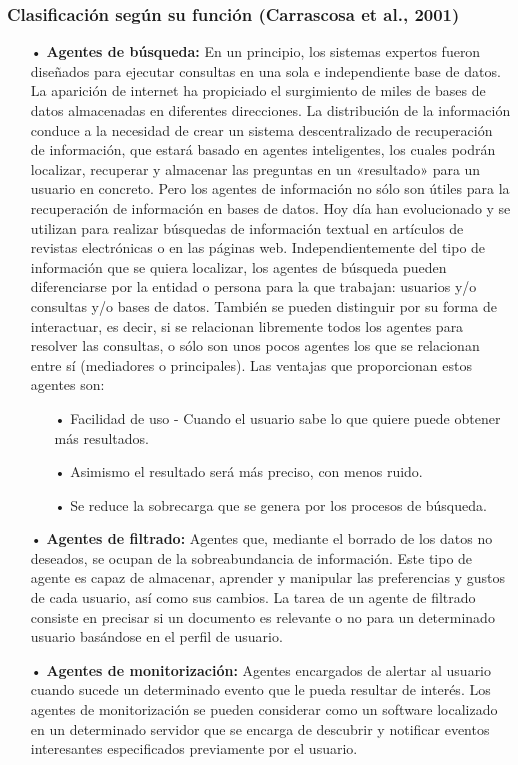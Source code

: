 \subsubsection{Clasificación según su función (Carrascosa et al., 2001)}

\begin{itemize}
\item[•] {\bf Agentes de búsqueda:} \vskip 0.1cm
En un principio, los sistemas expertos fueron diseñados para ejecutar consultas en una sola e independiente base de datos. La aparición de internet ha propiciado el surgimiento de miles de bases de datos almacenadas en diferentes direcciones.
\vskip 0.1cm
La distribución de la información conduce a la necesidad de crear un sistema descentralizado de recuperación de información, que estará basado en agentes inteligentes, los cuales podrán localizar, recuperar y almacenar las preguntas en un «resultado» para un usuario en concreto.
\vskip 0.1cm
Pero los agentes de información no sólo son útiles para la recuperación de información en bases de datos. Hoy día han evolucionado y se utilizan para realizar búsquedas de información textual en artículos de revistas electrónicas o en las páginas web. Independientemente del tipo de información que se quiera localizar, los agentes de búsqueda pueden diferenciarse por la entidad o persona para la que trabajan: usuarios y/o consultas y/o bases de datos. También se pueden distinguir por su forma de interactuar, es decir, si se relacionan libremente todos los agentes para resolver las consultas, o sólo son unos pocos agentes los que se relacionan entre sí (mediadores o principales).
\vskip 0.1cm
Las ventajas que proporcionan estos agentes son:
\begin{itemize}
\item[•] Facilidad de uso - Cuando el usuario sabe lo que quiere puede obtener más resultados.
\item[•] Asimismo el resultado será más preciso, con menos ruido.
\item[•] Se reduce la sobrecarga que se genera por los procesos de búsqueda.
\end{itemize}

\item[•] {\bf Agentes de filtrado:} \vskip 0.1cm
Agentes que, mediante el borrado de los datos no deseados, se ocupan de la sobreabundancia de información. Este tipo de agente es capaz de almacenar, aprender y manipular las preferencias y gustos de cada usuario, así como sus cambios. La tarea de un agente de filtrado consiste en precisar si un documento es relevante o no para un determinado usuario basándose en el perfil de usuario.

\item[•] {\bf Agentes de monitorización:} \vskip 0.1cm
Agentes encargados de alertar al usuario cuando sucede un determinado evento que le pueda resultar de interés. Los agentes de monitorización se pueden considerar como un software localizado en un determinado servidor que se encarga de descubrir y notificar eventos interesantes especificados previamente por el usuario.

\end{itemize}

